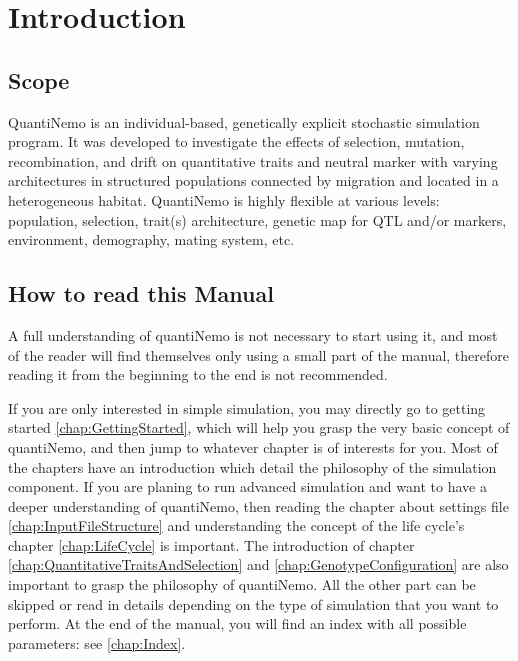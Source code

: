 \documentclass[letterpaper,12pt,oneside]{book}
\begin{document}
\frontmatter
\setcounter{tocdepth}{1}
\tableofcontents



\mainmatter
\setcounter{secnumdepth}{2}


\chapter{Introduction}\label{chap:Introduction}

\section{Scope}
QuantiNemo is an individual-based, genetically explicit stochastic simulation program. It was developed to investigate the effects of selection, mutation, recombination, and drift on quantitative traits and neutral marker with varying architectures in structured populations connected by migration and located in a heterogeneous habitat. QuantiNemo is highly flexible at various levels: population, selection, trait(s) architecture, genetic map for QTL and/or markers, environment, demography, mating system, etc.

\section{How to read this Manual}
A full understanding of quantiNemo is not necessary to start using it, and most of the reader will find themselves only using a small part of the manual, therefore reading it from the beginning to the end is not recommended. 

If you are only interested in simple simulation, you may directly go to getting started \ref{chap:GettingStarted}, which will help you grasp the very basic concept of quantiNemo, and then jump to whatever chapter is of interests for you. Most of the chapters have an introduction which detail the philosophy of the simulation component.  If you are planing to run advanced simulation and want to have a deeper understanding of quantiNemo, then reading the chapter about settings file \ref{chap:InputFileStructure} and understanding the concept of the life cycle's chapter \ref{chap:LifeCycle} is important. The introduction of chapter \ref{chap:QuantitativeTraitsAndSelection} and \ref{chap:GenotypeConfiguration} are also important to grasp the philosophy of quantiNemo. All the other part can be skipped or read in details depending on the type of simulation that you want to perform. 
At the end of the manual, you will find an index with all possible parameters: see  \ref{chap:Index}. 
\end{document}
